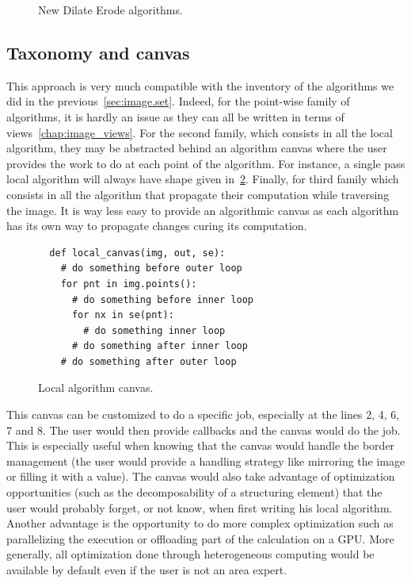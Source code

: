 \begin{figure}[htbp]
  \centering
  \vfil
  \smallskip
  \hfil
  \caption{New Dilate \vs Erode algorithms.}
  \label{code:erode.dilate.factorized}
\end{figure}

\subsection{Taxonomy and canvas}
\label{subsec.taxonomy.canvas}

This approach is very much compatible with the inventory of the algorithms we did in the previous~\cref{sec:image.set}.
Indeed, for the point-wise family of algorithms, it is hardly an issue as they can all be written in terms of
views~\cref{chap:image_views}. For the second family, which consists in all the local algorithm, they may be abstracted
behind an algorithm canvas where the user provides the work to do at each point of the algorithm. For instance, a single
pass local algorithm will always have shape given in~\ref{code:local.algorithm.canvas}. Finally, for third family which
consists in all the algorithm that propagate their computation while traversing the image. It is way less easy to
provide an algorithmic canvas as each algorithm has its own way to propagate changes curing its computation.

\begin{figure}[htbp]
  \centering
  \begin{verbatim}
  def local_canvas(img, out, se):
    # do something before outer loop
    for pnt in img.points():
      # do something before inner loop
      for nx in se(pnt):
        # do something inner loop
      # do something after inner loop
    # do something after outer loop
  \end{verbatim}

  \caption{Local algorithm canvas.}
  \label{code:local.algorithm.canvas}
\end{figure}

This canvas can be customized to do a specific job, especially at the lines 2, 4, 6, 7 and 8. The user would then
provide callbacks and the canvas would do the job. This is especially useful when knowing that the canvas would handle
the border management (the user would provide a handling strategy like mirroring the image or filling it with a value).
The canvas would also take advantage of optimization opportunities (such as the decomposability of a structuring
element) that the user would probably forget, or not know, when first writing his local algorithm. Another advantage is
the opportunity to do more complex optimization such as parallelizing the execution or offloading part of the
calculation on a GPU. More generally, all optimization done through heterogeneous computing would be available by
default even if the user is not an area expert.


